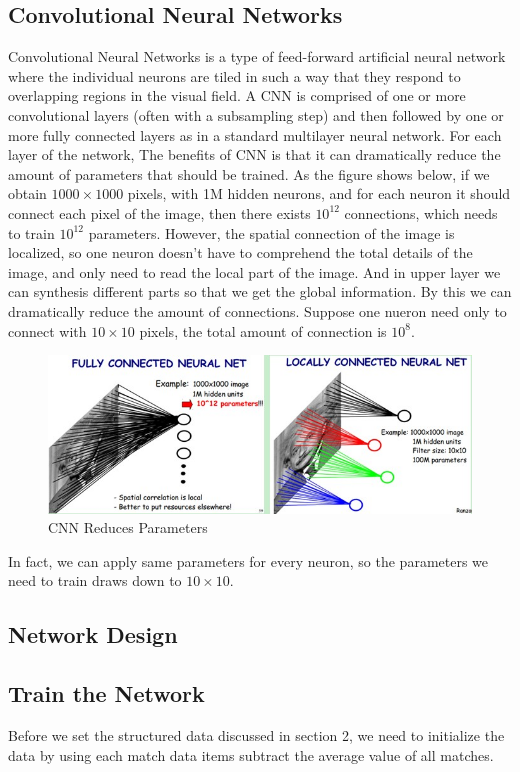 \documentclass[a4paper, 11pt]{article} %
\begin{document}
\subsection{Convolutional Neural Networks}
Convolutional Neural Networks is a type of feed-forward artificial neural network where the individual neurons are tiled in such a way that they respond to overlapping regions in the visual field.\cite{CNN1} A CNN is comprised of one or more convolutional layers (often with a subsampling step) and then followed by one or more fully connected layers as in a standard multilayer neural network.\cite{CNN2} For each layer of the network, 
The benefits of CNN is that it can dramatically reduce the amount of parameters that should be trained. As the figure shows below, if we obtain $1000 \times 1000$ pixels, with 1M hidden neurons, and for each neuron it should connect each pixel of the image, then there exists $10^{12}$ connections, which needs to train $10^{12}$ parameters. However, the spatial connection of the image is localized, so one neuron doesn't have to comprehend the total details of the image, and only need to read the local part of the image. And in upper layer we can synthesis different parts so that we get the global information. By this we can dramatically reduce the amount of connections. Suppose one nueron need only to connect with $10 \times 10$ pixels, the total amount of connection is $10^8$.
\begin{figure}[h]
	\centering 
	\includegraphics[width=0.8\linewidth]{Figure2.jpg}
	\caption{CNN Reduces Parameters}
	\label{fig:subfig}
\end{figure}

In fact, we can apply same parameters for every neuron, so the parameters we need to train draws down to $10 \times 10$.

\subsection{Network Design}


\subsection{Train the Network}
Before we set the structured data discussed in section 2, we need to initialize the data by using each match data items subtract the average value of all matches.
\end{document}
